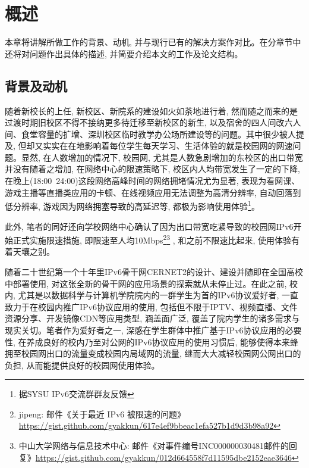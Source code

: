 
\chapter{概述}
\label{cha:introduction}

本章将讲解所做工作的背景、动机, 并与现行已有的解决方案作对比。在分章节中还将对问题作出具体的描述, 并简要介绍本文的工作及论文结构。

\section{背景及动机}
\label{sec:background}
随着新校长的上任, 新校区、新院系的建设如火如荼地进行着, 然而随之而来的是过渡时期旧校区不得不接纳更多待迁移至新校区的新生, 以及宿舍的四人间改六人间、食堂容量的扩增、深圳校区临时教学办公场所建设等的问题。其中很少被人提及, 但却又实实在在地影响着每位学生每天学习、生活体验的就是校园网的网速问题。显然, 在人数增加的情况下, 校园网, 尤其是人数急剧增加的东校区的出口带宽并没有随着之增加, 在网络中心的限速策略下, 校区内人均带宽发生了一定的下降, 在晚上(18:00~24:00)这段网络高峰时间的网络拥堵情况尤为显著, 表现为看网课、游戏主播等直播类应用的卡顿、在线视频应用无法调整为高清分辨率, 自动回落到低分辨率, 游戏因为网络拥塞导致的高延迟等, 都极为影响使用体验\footnote{据SYSU IPv6交流群群友反馈}。

此外, 笔者的同好还向学校网络中心确认了因为出口带宽吃紧导致的校园网IPv6开始正式实施限速措施, 即限速至人均10Mbps\footnote{jipeng: 邮件《关于最近 IPv6 被限速的问题》\url{https://gist.github.com/gyakkun/617e4ef9bbeac1efa527b1d9d3b98a92}}\footnote{中山大学网络与信息技术中心: 邮件《对事件编号INC000000030481邮件的回复》\url{https://gist.github.com/gyakkun/012d664558f7d11595dbe2152eae3646}}
, 和之前不限速比起来, 使用体验有着天壤之别。

随着二十世纪第一个十年里IPv6骨干网CERNET2的设计、建设\cite{wujianping2005cngicernet2arch}并随即在全国高校中部署使用\cite{coverreport2005cernet2cngi6ix}, 对这张全新的骨干网的应用场景的探索就从未停止过\cite{huping2008cnnetandcngiapp}。在此之前, 校内, 尤其是以数据科学与计算机学院院内的一群学生为首的IPv6协议爱好者, 一直致力于在校园内推广IPv6协议应用的使用, 包括但不限于IPTV\cite{wangjilong2007iptvincernet2}、视频直播、文件资源分享、开发镜像CDN等应用类型, 涵盖面广泛, 覆盖了院内学生的诸多需求与现实关切。笔者作为爱好者之一, 深感在学生群体中推广基于IPv6协议应用的必要性, 在养成良好的校内乃至对公网的IPv6协议应用的使用习惯后, 能够使得本来蜂拥至校园网出口的流量变成校园内局域网的流量, 继而大大减轻校园网公网出口的负担, 从而能提供良好的校园网使用体验。


